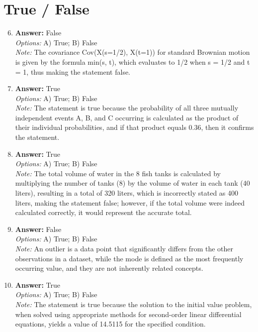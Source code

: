 \documentclass[12pt]{article}
\begin{document}
\section*{True / False}
\begin{enumerate}[label=\arabic*.]
\setcounter{enumi}{5}
\item \textbf{Answer:} False
\\ \textit{Options:} A) True; B) False
\\ \textit{Note:} The covariance Cov(X(s=1/2), X(t=1)) for standard Brownian motion is given by the formula min(s, t), which evaluates to 1/2 when s = 1/2 and t = 1, thus making the statement false.
\item \textbf{Answer:} True
\\ \textit{Options:} A) True; B) False
\\ \textit{Note:} The statement is true because the probability of all three mutually independent events A, B, and C occurring is calculated as the product of their individual probabilities, and if that product equals 0.36, then it confirms the statement.
\item \textbf{Answer:} True
\\ \textit{Options:} A) True; B) False
\\ \textit{Note:} The total volume of water in the 8 fish tanks is calculated by multiplying the number of tanks (8) by the volume of water in each tank (40 liters), resulting in a total of 320 liters, which is incorrectly stated as 400 liters, making the statement false; however, if the total volume were indeed calculated correctly, it would represent the accurate total.
\item \textbf{Answer:} False
\\ \textit{Options:} A) True; B) False
\\ \textit{Note:} An outlier is a data point that significantly differs from the other observations in a dataset, while the mode is defined as the most frequently occurring value, and they are not inherently related concepts.
\item \textbf{Answer:} True
\\ \textit{Options:} A) True; B) False
\\ \textit{Note:} The statement is true because the solution to the initial value problem, when solved using appropriate methods for second-order linear differential equations, yields a value of 14.5115 for the specified condition.
\end{enumerate}
\end{document}
